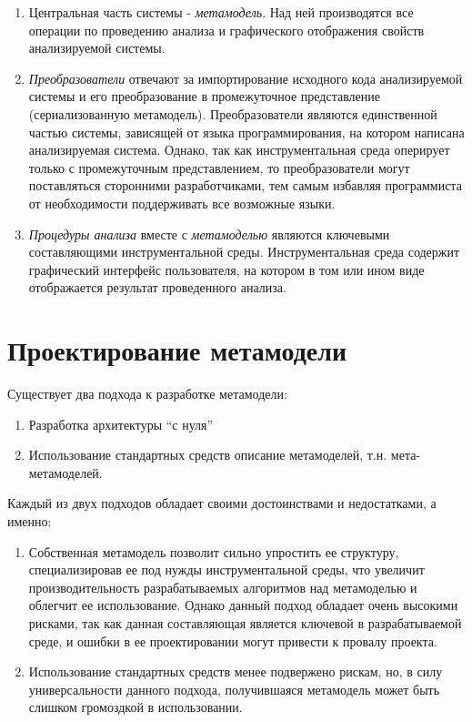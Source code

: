 \begin{enumerate}
    \item Центральная часть системы - \emph{метамодель}. Над ней производятся
    все операции по проведению анализа и графического отображения свойств
    анализируемой системы.
    \item \emph{Преобразователи} отвечают за импортирование исходного кода
    анализируемой системы и его преобразование в промежуточное представление
    (сериализованную метамодель). Преобразователи являются единственной частью
    системы, зависящей от языка программирования, на котором написана
    анализируемая система. Однако, так как инструментальная среда оперирует
    только с промежуточным представлением, то преобразователи могут поставляться
    сторонними разработчиками, тем самым избавляя программиста от необходимости
    поддерживать все возможные языки.
    \item \emph{Процедуры анализа} вместе с \emph{метамоделью} являются
    ключевыми составляющими инструментальной среды. Инструментальная среда
    содержит графический интерфейс пользователя, на котором в том или ином виде
    отображается результат проведенного анализа.
\end{enumerate}

\section{Проектирование метамодели}
\label{sec:metamodel_architecture}
Существует два подхода к разработке метамодели:

\begin{enumerate}
    \item Разработка архитектуры ``с нуля''
    \item Использование стандартных средств описание метамоделей, т.н.
    мета-метамоделей.
\end{enumerate}

Каждый из двух подходов обладает своими достоинствами и недостатками, а именно:

\begin{enumerate}
    \item Собственная метамодель позволит сильно упростить ее структуру,
    специализировав ее под нужды инструментальной среды, что увеличит
    производительность разрабатываемых алгоритмов над метамоделью и облегчит ее
    использование. Однако данный подход обладает очень высокими рисками, так как
    данная составляющая является ключевой в разрабатываемой среде, и ошибки в ее
    проектировании могут привести к провалу проекта.
    \item Использование стандартных средств менее подвержено рискам, но, в силу
    универсальности данного подхода, получившаяся метамодель может быть слишком
    громоздкой в использовании.
\end{enumerate}

